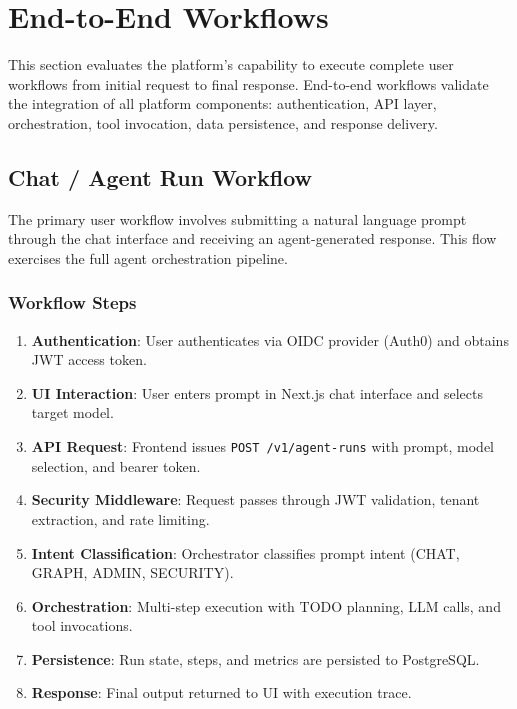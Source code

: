 
\section{End-to-End Workflows}
\label{sec:e2e-workflows}

This section evaluates the platform's capability to execute complete user workflows from initial request to final response. End-to-end workflows validate the integration of all platform components: authentication, API layer, orchestration, tool invocation, data persistence, and response delivery.

\subsection{Chat / Agent Run Workflow}

The primary user workflow involves submitting a natural language prompt through the chat interface and receiving an agent-generated response. This flow exercises the full agent orchestration pipeline.

\subsubsection{Workflow Steps}

\begin{enumerate}
    \item \textbf{Authentication}: User authenticates via OIDC provider (Auth0) and obtains JWT access token.
    
    \item \textbf{UI Interaction}: User enters prompt in Next.js chat interface and selects target model.
    
    \item \textbf{API Request}: Frontend issues \texttt{POST /v1/agent-runs} with prompt, model selection, and bearer token.
    
    \item \textbf{Security Middleware}: Request passes through JWT validation, tenant extraction, and rate limiting.
    
    \item \textbf{Intent Classification}: Orchestrator classifies prompt intent (CHAT, GRAPH, ADMIN, SECURITY).
    
    \item \textbf{Orchestration}: Multi-step execution with TODO planning, LLM calls, and tool invocations.
    
    \item \textbf{Persistence}: Run state, steps, and metrics are persisted to PostgreSQL.
    
    \item \textbf{Response}: Final output returned to UI with execution trace.
\end{enumerate}

